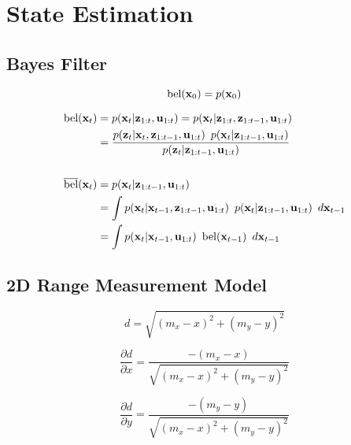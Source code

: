 \chapter{State Estimation}

\section{Bayes Filter}

\begin{equation}
  \text{bel}({\mathbf{x}}_{0}) = p({\mathbf{x}}_{0})
\end{equation}

\begin{align}
  \text{bel}({\mathbf{x}}_{t})
    &=
    p({\mathbf{x}}_{t} | {{\mathbf{z}}}_{1:t}, {{\mathbf{u}}}_{1:t}) =
    p({\mathbf{x}}_{t} | {{\mathbf{z}}}_{1:t}, {{\mathbf{z}}}_{1:t-1}, {{\mathbf{u}}}_{1:t}) \\
    &=
    \dfrac{
      p({{\mathbf{z}}}_{t} | {\mathbf{x}}_{t}, {{\mathbf{z}}}_{1:t-1}, {{\mathbf{u}}}_{1:t})
      \enspace
      p({\mathbf{x}}_{t} | {{\mathbf{z}}}_{1:t-1}, {{\mathbf{u}}}_{1:t})
    }{
      p({{\mathbf{z}}}_{t} | {{\mathbf{z}}}_{1:t-1}, {{\mathbf{u}}}_{1:t})
    } \\ 
  \nonumber \\
  \overline{\text{bel}}({\mathbf{x}}_{t})
    &=
      p({\mathbf{x}}_{t} | {{\mathbf{z}}}_{1:t-1}, {{\mathbf{u}}}_{1:t}) \\
    &=
      \int
      p({\mathbf{x}}_{t} | {\mathbf{x}}_{t-1}, {{\mathbf{z}}}_{1:t-1}, {{\mathbf{u}}}_{1:t})
      \enspace
      p({\mathbf{x}}_{t} | {{\mathbf{z}}}_{1:t-1}, {{\mathbf{u}}}_{1:t})
      \enspace
      d{\mathbf{x}}_{t-1} \\
    &=
      \int
      p({\mathbf{x}}_{t} | {\mathbf{x}}_{t-1}, {{\mathbf{u}}}_{1:t})
      \enspace
      \text{bel}({\mathbf{x}}_{t-1})
      \enspace
      d{\mathbf{x}}_{t-1}
\end{align}


\section{2D Range Measurement Model}

\begin{equation}
  \boxed{
    d = \sqrt{(m_x - x)^2 + (m_y - y)^2}
  }
\end{equation}

\begin{equation}
  \boxed{
    \dfrac{\partial d}{\partial x}
      = \dfrac{-(m_x - x)}{\sqrt{(m_x - x)^2 + (m_y - y)^2}}
  }
\end{equation}

\begin{equation}
  \boxed{
    \dfrac{\partial d}{\partial y}
      = \dfrac{-(m_y - y)}{\sqrt{(m_x - x)^2 + (m_y - y)^2}}
  }
\end{equation}

